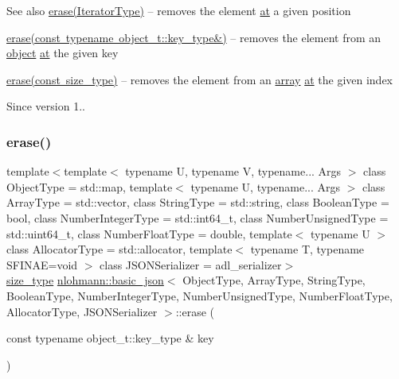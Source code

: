 \begin{DoxySeeAlso}{See also}
\mbox{\hyperlink{classnlohmann_1_1basic__json_a068a16e76be178e83da6a192916923ed}{erase(\+Iterator\+Type)}} -- removes the element \mbox{\hyperlink{classnlohmann_1_1basic__json_a73ae333487310e3302135189ce8ff5d8}{at}} a given position 

\mbox{\hyperlink{classnlohmann_1_1basic__json_a2f8484d69c55d8f2a9697a7bec29362a}{erase(const typename object\+\_\+t\+::key\+\_\+type\&)}} -- removes the element from an \mbox{\hyperlink{classnlohmann_1_1basic__json_aa13f7c0615867542ce80337cbcf13ada}{object}} \mbox{\hyperlink{classnlohmann_1_1basic__json_a73ae333487310e3302135189ce8ff5d8}{at}} the given key 

\mbox{\hyperlink{classnlohmann_1_1basic__json_a88cbcefe9a3f4d294bed0653550a5cb9}{erase(const size\+\_\+type)}} -- removes the element from an \mbox{\hyperlink{classnlohmann_1_1basic__json_aa80485befaffcadaa39965494e0b4d2e}{array}} \mbox{\hyperlink{classnlohmann_1_1basic__json_a73ae333487310e3302135189ce8ff5d8}{at}} the given index
\end{DoxySeeAlso}
\begin{DoxySince}{Since}
version 1.. 
\end{DoxySince}
\mbox{\label{classnlohmann_1_1basic__json_a2f8484d69c55d8f2a9697a7bec29362a}} 
\subsubsection{\texorpdfstring{erase()}{erase()}\hspace{0.1cm}{\footnotesize\ttfamily [3/4]}}
{\footnotesize\ttfamily template$<$template$<$ typename U, typename V, typename... Args $>$ class Object\+Type = std\+::map, template$<$ typename U, typename... Args $>$ class Array\+Type = std\+::vector, class String\+Type  = std\+::string, class Boolean\+Type  = bool, class Number\+Integer\+Type  = std\+::int64\+\_\+t, class Number\+Unsigned\+Type  = std\+::uint64\+\_\+t, class Number\+Float\+Type  = double, template$<$ typename U $>$ class Allocator\+Type = std\+::allocator, template$<$ typename T, typename S\+F\+I\+N\+A\+E=void $>$ class J\+S\+O\+N\+Serializer = adl\+\_\+serializer$>$ \\
\mbox{\hyperlink{classnlohmann_1_1basic__json_a39f2cd0b58106097e0e67bf185cc519b}{size\+\_\+type}} \mbox{\hyperlink{classnlohmann_1_1basic__json}{nlohmann\+::basic\+\_\+json}}$<$ Object\+Type, Array\+Type, String\+Type, Boolean\+Type, Number\+Integer\+Type, Number\+Unsigned\+Type, Number\+Float\+Type, Allocator\+Type, J\+S\+O\+N\+Serializer $>$\+::erase (\begin{DoxyParamCaption}\item[{const typename object\+\_\+t\+::key\+\_\+type \&}]{key }\end{DoxyParamCaption})\hspace{0.3cm}{\ttfamily [inline]}}



